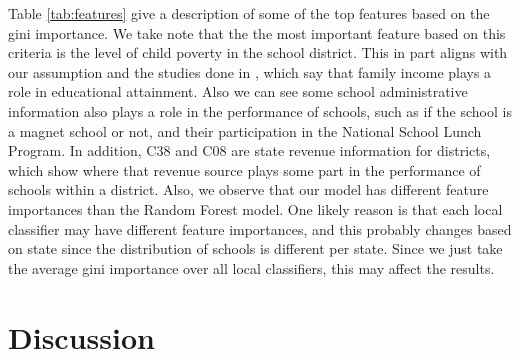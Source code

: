 Table \ref{tab:features} give a description of some of the top features based on the gini importance. We take note that the the most important feature based on this criteria is the level of child poverty in the school district. This in part aligns with our assumption and the studies done in \cite{income2002greg,income2015breen}, which say that family income plays a role in educational attainment. Also we can see some school administrative information also plays a role in the performance of schools, such as if the school is a magnet school or not, and their participation in the National School Lunch Program. In addition, C38 and C08 are state revenue information for districts, which show where that revenue source plays some part in the performance of schools within a district. Also, we observe that our model has different feature importances than the Random Forest model. One likely reason is that each local classifier may have different feature importances, and this probably changes based on state since the distribution of schools is different per state. Since we just take the average gini importance over all local classifiers, this may affect the results.

\section{Discussion} \label{sec:discuss}


